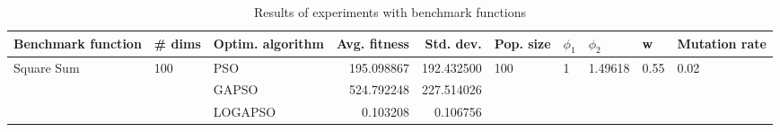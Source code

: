 \begin{table}
\centering
\caption{Results of experiments with benchmark functions}
\begin{tabular}{lllrrlllll}
\toprule
         Benchmark function &              \# dims & Optim. algorithm &  Avg. fitness &  Std. dev. &            Pop. size &         $\phi_{1}$ &               $\phi_{2}$ &                     w &         Mutation rate \\
\midrule
\multirow{3}{*}{Square Sum} & \multirow{3}{*}{100} &              PSO &    195.098867 & 192.432500 & \multirow{3}{*}{100} & \multirow{3}{*}{1} & \multirow{3}{*}{1.49618} & \multirow{3}{*}{0.55} & \multirow{3}{*}{0.02} \\
                            &                      &            GAPSO &    524.792248 & 227.514026 &                      &                    &                          &                       &                       \\
                            &                      &          LOGAPSO &      0.103208 &   0.106756 &                      &                    &                          &                       &                       \\
\bottomrule
\end{tabular}
\end{table}
